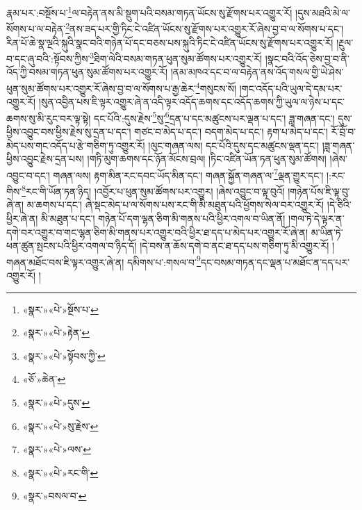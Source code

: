 རྣམ་པར་:བསྔོས་པ་\footnote{«སྣར་»«པེ་»སྔོས་པ་}ལ་བརྟེན་ནས་མི་སྡུག་པའི་བསམ་གཏན་ཡོངས་སུ་རྫོགས་པར་འགྱུར་རོ། །དུས་མཐའི་མེ་ལ་སོགས་པ་ལ་བརྟེན་\footnote{«སྣར་»«པེ་»རྟེན་}ནས་ཟད་པར་གྱི་ཏིང་ངེ་འཛིན་ཡོངས་སུ་རྫོགས་པར་འགྱུར་རོ་ཞེས་བྱ་བ་ལ་སོགས་པ་དང་། རིན་པོ་ཆེ་སྣ་ལྔའི་སྐུའི་སྣང་བའི་གཉེན་པོ་དང་བཅས་པས་སྐུའི་ཏིང་ངེ་འཛིན་ཡོངས་སུ་རྫོགས་པར་འགྱུར་རོ། །རྔུལ་བ་དང་ཞུ་བའི་:སྟོབས་ཀྱིས་\footnote{«སྣར་»«པེ་»སྟོབས་ཀྱི་}ཐིག་ལེའི་བསམ་གཏན་ཕུན་སུམ་ཚོགས་པར་འགྱུར་རོ། །སྣང་བའི་འོད་ཅེས་བྱ་བ་ནི་འོད་ཀྱི་བསམ་གཏན་ཕུན་སུམ་ཚོགས་པར་འགྱུར་རོ། །ནམ་མཁའ་དང་བ་ལ་བརྟེན་ནས་འོད་གསལ་གྱི་ཡེ་ཤེས་ཕུན་སུམ་ཚོགས་པར་འགྱུར་རོ་ཞེས་བྱ་བ་ལ་སོགས་པ་རྒྱ་ཆེར་\footnote{«ཅོ་»ཆེན་}གསུངས་སོ། །གང་འདོད་པའི་ཡུལ་དེ་དམ་པར་འགྱུར་རོ། །སུན་འབྱིན་པས་ཇི་ལྟར་འགྱུར་ཞེ་ན་འདི་ལྟར་འདོད་ཆགས་དང་འདོད་ཆགས་ཀྱི་ཡུལ་ལ་ཉེས་པ་དང་ཆགས་སུ་མི་རུང་བར་ལྟ་སྟེ། དང་པོའི་:དུས་རྗེས་\footnote{«སྣར་»«པེ་»དུས་}སུ་\footnote{«སྣར་»«པེ་»སུ་རྗེས་}དྲན་པ་དང་མཚུངས་པར་ལྡན་པ་དང་། ཟླ་གཞན་དང་། དུས་ཕྱིས་འབྱུང་བས་ཕྱིས་རྗེས་སུ་དྲན་པ་དང་། གཙང་བ་མེད་པ་དང་། བདག་མེད་པ་དང་། རྟག་པ་མེད་པ་དང་། རོ་བྲོ་བ་མེད་པས་གང་འདོད་པ་རྩེ་གཅིག་ཏུ་འགྱུར་རོ། །ལུང་གཞན་ལས། དང་པོའི་དུས་དང་མཚུངས་ལྡན་དང་། །ཟླ་གཞན་ཕྱིས་འབྱུང་རྗེས་དྲན་པས། །གཏི་མུག་ཆགས་དང་ཉོན་མོངས་བྲལ། །ཏིང་འཛིན་ཡོན་ཏན་ཕུན་སུམ་ཚོགས། །ཞེས་འབྱུང་བ་དང་། གཞན་ལས། རྟག་མིན་རང་དབང་ཡོད་མིན་དང་། གཞན་སྐྱོན་གཞན་ལ་\footnote{«སྣར་»«པེ་»ལས་}ལྡན་གྱུར་དང་། །:རང་གིས་\footnote{«སྣར་»«པེ་»རང་གི་}རང་གི་ཡོན་ཏན་ཉིད། །འབྱོར་པ་ཕུན་སུམ་ཚོགས་པར་འགྱུར། །ཞེས་འབྱུང་བ་ལྟ་བུའོ། །གཉེན་པོས་ཇི་ལྟ་བུ་ཞེ་ན། མ་ཆགས་པ་དང་། ཞེ་སྡང་མེད་པ་ལ་སོགས་པས་རང་གི་མི་མཐུན་པའི་ཕྱོགས་སེལ་བར་འགྱུར་རོ། །དེ་ཅིའི་ཕྱིར་ཞེ་ན། མི་མཐུན་པ་དང་། གཉེན་པོ་དག་ལྷན་ཅིག་མི་གནས་པའི་ཕྱིར་འགལ་བ་ཡིན་ནོ། །གལ་ཏེ་དེ་ལྟར་ན་དགེ་བར་འགྱུར་བ་གང་ལྷན་ཅིག་མི་གནས་པར་འགྱུར་བའི་ཕྱིར་ཐ་དད་པ་མེད་པར་འགྱུར་རོ་ཞེ་ན། མ་ཡིན་ཏེ་ཕན་ཚུན་སྤངས་པའི་ཕྱིར་འགལ་བ་ཉིད་དོ། །དེ་བས་ན་ཆོས་དགེ་བ་ནང་ཐ་དད་པས་གཅིག་ཏུ་མི་འགྱུར་རོ། །གཞན་མཐོང་བས་ཇི་ལྟར་འགྱུར་ཞེ་ན། དམིགས་པ་:གསལ་བ་\footnote{«སྣར་»བསལ་བ་}དང་བསམ་གཏན་དང་ལྡན་པ་མཐོང་ན་དད་པར་འགྱུར་རོ། །

